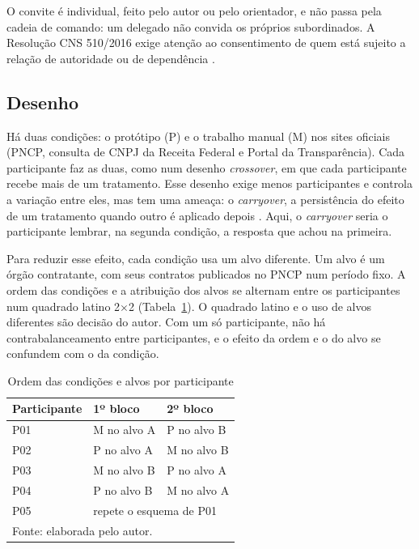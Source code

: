 O convite é individual, feito pelo autor ou pelo orientador, e não passa pela
cadeia de comando: um delegado não convida os próprios subordinados. A
Resolução CNS 510/2016 exige atenção ao consentimento de quem está sujeito a
relação de autoridade ou de dependência \cite[art.~11 e art.~20]{cns2016res510}.

\subsection{Desenho}
\label{sec:avaliacao-desenho}

Há duas condições: o protótipo (P) e o trabalho manual (M) nos sites
oficiais (PNCP, consulta de CNPJ da Receita Federal e Portal da
Transparência). Cada participante faz as duas, como num desenho
\textit{crossover}, em que cada participante recebe mais de um tratamento.
Esse desenho exige menos participantes e controla a variação entre eles,
mas tem uma ameaça: o \textit{carryover}, a persistência do efeito de um
tratamento quando outro é aplicado depois \cite{vegas2016crossover}. Aqui, o
\textit{carryover} seria o participante lembrar, na segunda condição, a
resposta que achou na primeira.

Para reduzir esse efeito, cada condição usa um alvo diferente. Um alvo é um
órgão contratante, com seus contratos publicados no PNCP num período fixo. A
ordem das condições e a atribuição dos alvos se alternam entre os
participantes num quadrado latino 2$\times$2
(Tabela~\ref{tab:avaliacao-ordem}). O quadrado latino e o uso de alvos
diferentes são decisão do autor. Com um só participante, não há
contrabalanceamento entre participantes, e o efeito da ordem e o do alvo se
confundem com o da condição.

\begin{table}[htbp]
\centering
\caption{Ordem das condições e alvos por participante}
\label{tab:avaliacao-ordem}
\small
\begin{tabular}{lll}
\hline
\textbf{Participante} & \textbf{1º bloco} & \textbf{2º bloco} \\ \hline
P01 & M no alvo A & P no alvo B \\
P02 & P no alvo A & M no alvo B \\
P03 & M no alvo B & P no alvo A \\
P04 & P no alvo B & M no alvo A \\
P05 & \multicolumn{2}{l}{repete o esquema de P01} \\ \hline
\multicolumn{3}{l}{\footnotesize Fonte: elaborada pelo autor.}\\
\end{tabular}
\end{table}

